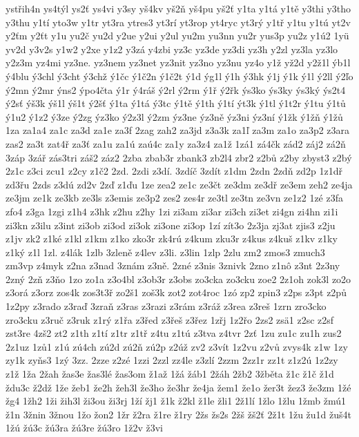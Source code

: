 {ystřih4n
ys4týl
ys2ť
ys4vi
y3sy
yš4kv
yš2ň
yš4pu
yš2ť
y1ta
y1tá
y1tě
y3thi
y3tho
y3thu
y1tí
yto3w
y1tr
yt3ra
ytres3
yt3rí
yt3rop
yt4ryc
yt3rý
y1tř
y1tu
y1tú
yt2v
y2ťm
y2ťt
y1u
yu2č
yu2d
y2ue
y2ui
y2ul
yu2m
yu3nn
yu2r
yus3p
yu2z
y1ú2
1yü
yv2d
y3v2s
y1w2
y2xe
y1z2
y3zá
y4zbi
yz3c
yz3de
yz3di
yz3h
y2zl
yz3la
yz3lo
y2z3m
yz4mi
yz3ne.
yz3nem
yz3net
yz3nit
yz3no
yz3nu
yz4o
y1ž
yž2d
y2ž1l
ýb1l
ý4blu
ý3chl
ý3cht
ý3chž
ý1čc
ý1č2n
ý1č2t
ý1d
ýg1l
ý1h
ý3hk
ý1j
ý1k
ý1l
ý2ll
ý2ľo
ý2mn
ý2mr
ýns2
ýpo4čta
ý1r
ý4ráš
ý2rl
ý2rm
ý1ř
ý2řk
ýs3ko
ýs3ky
ýs3ký
ýs2t4
ý2sť
ýš3k
ýš1l
ýš1t
ý2šť
ý1ta
ý1tá
ý3tc
ý1tě
ý1th
ý1tí
ýt3k
ý1tl
ý1t2r
ý1tu
ý1tů
ý1u2
ý1z2
ý3ze
ý2zg
ýz3ko
ý2z3l
ý2zm
ýz3ne
ýz3ně
ýz3ni
ýz3ní
ý1žk
ý1žň
ý1žů
1za
za1a4
za1c
za3d
za1e
za3f
2zag
zah2
za3jd
z3a3k
za1ľ
za3m
za1o
za3p2
z3ara
zas2
za3t
zat4ř
za3ť
za1u
za1ú
zaú4c
za1y
za3z4
za1ž
1zá1
zá4čk
zád2
záj2
zá2ň
3záp
3zář
zás3tri
záš2
záz2
2zba
zbab3r
zbank3
zb2l4
zbr2
z2bů
z2by
zbyst3
z2bý
2z1c
z3ci
zcu1
z2cy
z1č2
2zd.
2zdi
z3dí.
3zdíč
3zdít
z1dm
2zdn
2zdň
zd2p
1z1dř
zd3řu
2zds
z3dú
zd2v
2zď
z1ďu
1ze
zea2
ze1c
ze3čt
ze3dm
ze3dř
ze3em
zeh2
ze4ja
ze3jm
ze1k
ze3kb
ze3ls
z3emis
ze3p2
zes2
zes4r
ze3tl
ze3tn
ze3vn
ze1z2
1zé
z3fa
zfo4
z3ga
1zgi
z1h4
z3hk
z2hu
z2hy
1zi
zi3am
zi3ar
zi3ch
zi3et
zi4gn
zi4hn
zi1i
zi3kn
z3ilu
z3int
zi3ob
zi3od
zi3ok
zi3one
zi3op
1zí
zít3o
2z3ja
zj3at
zjis3
z2ju
z1jv
zk2
z1ké
z1kl
z1km
z1ko
zko3r
zk4rú
z4kum
zku3r
z4kus
z4kuš
z1kv
z1ky
z1ký
z1l
1zl.
z4lák
1zlb
3zleně
z4lev
z3li.
z3lin
1zlp
2zlu
zm2
zmos3
zmuch3
zm3vp
z4myk
z2na
z3nad
3znám
z3ně.
2zné
z3nis
3znivk
2zno
z1nô
z3nt
2z3ny
2zný
2zň
z3ňo
1zo
zo1a
z3o4bl
z3ob3r
z3obs
zo3cka
zo3cku
zoe2
2z1oh
zok3l
zo2o
z3orá
z3orz
zos4k
zos3t3ř
zo2š1
zoš3k
zot2
zot4roc
1zó
zp2
zpin3
z2ps
z3pt
z2pů
1z2py
z3rado
z3raď
3zraň
z3ras
z3razi
z3rám
z3ráž
z3rea
z3reš
1zrn
zro3cko
zro3cku
z3ruč
z3ruk
z1rý
z1řa
z3řed
z3řeš
z3řez
1zřj
1z2řo
2zs2
zsä1
z2sc
z2sf
zst3re
4zš2
zt2
z1th
z1tí
z1tr
z1tř
z4tu
z1tú
z3tva
z4tvr
2zť
1zu
zu1c
zu1h
zus2
2z1uz
1zů1
z1ú
zú4ch
zú2d
zú2ň
zú2p
z2úž
zv2
z3vít
1z2vu
z2vů
zvys4k
z1w
1zy
zy1k
zyňs3
1zý
3zz.
2zze
z2zé
1zzi
2zzl
zz4le
z3zlí
2zzm
2zz1r
zz1t
z1z2ú
1z2zy
z1ž
1ža
2žah
žas3e
žas3lé
žas3om
ž1až
1žá
žáb1
2žáh
2žb2
3žběta
ž1c
ž1č
ž1d
ždu3c
ž2dž
1že
žeb1
že2h
žeh3l
že3ho
že3hr
že4ja
žem1
že1o
žer3t
žez3
že3zm
1žé
žg4
1žh2
1ži
žih3l
ži3ou
ži3rj
1ží
žj1
ž1k
ž2kl
ž1le
žli1
2ž1lí
1žlo
1žlu
1žmb
žmú1
ž1n
3žnin
3žnou
1žo
žon2
1žr
ž2ra
ž1re
ž1ry
2žs
žs2s
2žš
žš2ť
2ž1t
1žu
žu1d
žuš4t
1žú
žú3c
žú3ra
žú3re
žú3ro
1ž2v
ž3vi
}
